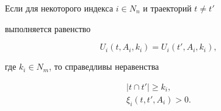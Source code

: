\begin{lem} \label{lem2}


Если для некоторого индекса $i\in N_n$ и траекторий $t \neq t'$


выполняется равенство


\begin{equation} \label{lbz}


 U_i(t, A_i, k_i)=U_i(t', A_i, k_i),


\end{equation}


где $k_i\in N_m$, то справедливы неравенства


\begin{gather} \label{lb3}


|t\cap t'|\geq k_i,\\


\label{lb4}


 \xi_i(t, t', A_i)>0.


\end{gather}


\end{lem}





